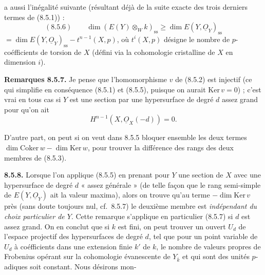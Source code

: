 \documentclass[11pt,a4paper]{article}
\begin{document}

a aussi l'inégalité suivante (résultant déjà de la suite exacte des trois
derniers termes de (8.5.1)) :
\[
(8.5.6) \qquad \dim (E(Y) \otimes_{W} k)_{\mathrm{ss}} \geq
\dim E(Y, \underline{O}_{Y})_{\mathrm{ss}}
\]
$= \dim E(Y, \underline{O}_{Y})_{\mathrm{ss}} - t^{n-1}(X, p)$, où
$t^{i}(X, p)$ désigne le nombre de $p$-coéfficients de torsion de $X$ (défini
via la cohomologie cristalline de $X$ en dimension $i$).

\textbf{Remarques 8.5.7.} Je pense que l'homomorphisme $v$ de (8.5.2) est
injectif (ce qui simplifie en conséquence (8.5.1) et (8.5.5), puisque on
aurait $\mathrm{Ker}\, v = 0$) ; c'est vrai en tous cas si 
$Y$ est une section par une hypersurface de degré $d$ assez grand pour qu'on
ait
\[
H^{n-1}(X, \underline{O}_{X}(-d)) = 0 .
\]

D'autre part, on peut si on veut dans 8.5.5 bloquer ensemble les deux
termes $\dim \mathrm{Coker}\, w - \dim \mathrm{Ker}\, w$, pour trouver la
différence des rangs des deux membres de (8.5.3).

\textbf{8.5.8.} Lorsque l'on applique (8.5.5) en prenant pour $Y$ une section
de $X$ avec une hypersurface de degré $d$ « assez générale » (de telle façon
que le rang semi-simple de $E(Y, \underline{O}_{Y})$ ait la valeur maxima),
alors on trouve qu'au terme $- \dim \mathrm{Ker}\, v$ près (sans doute toujours
nul, cf.\ 8.5.7) le deuxième membre est \emph{indépendant du choix particulier
de $Y$}. Cette remarque s'applique en particulier (8.5.7) si $d$ est assez
grand. On en conclut que si $k$ est fini, on peut trouver un ouvert $U_{d}$ de
l'espace projectif des hypersurfaces de degré $d$, tel que pour un point
variable de $U_{d}$ à coéfficients dans une extension finie $k'$ de $k$, le
nombre de valeurs propres de Frobenius opérant sur la cohomologie évanescente de
$Y_{\overline{k}}$ et qui sont des unités $p$-adiques soit constant. Nous
désirons mon-

\end{document}
